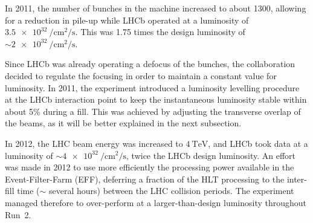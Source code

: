

In 2011, the number of bunches in the machine increased to about 1300, allowing for a reduction in pile-up while LHCb operated at a luminosity of $\SI{3.5e32}{\per\centi\meter\squared\per\second}$. This was 1.75 times the design luminosity of $\sim \SI{2e32}{\per\centi\meter\squared\per\second}$. %

Since LHCb was already operating a defocus of the bunches, the collaboration decided to regulate the focusing in order to maintain a constant value for luminosity. In 2011, the experiment introduced a luminosity levelling procedure at the LHCb interaction point to keep the instantaneous luminosity stable within about 5\% during a fill. This was achieved by adjusting the transverse overlap of the beams, as it will be better explained in the next subsection.

In 2012, the LHC beam energy was increased to $\SI{4}{\tera\eV}$, and LHCb took data at a luminosity of $\sim \SI{4e32}{\per\centi\meter\squared\per\second}$, twice the LHCb design luminosity. An effort was made in 2012 to use more efficiently the processing power available in the Event-Filter-Farm (EFF), deferring a fraction of the HLT processing to the inter-fill time ($\sim$ several hours) between the LHC collision periods. The experiment managed therefore to over-perform at a larger-than-design luminosity throughout Run~2.  


